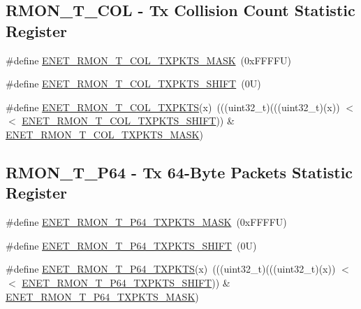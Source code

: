 \subsection*{R\+M\+O\+N\+\_\+\+T\+\_\+\+C\+OL -\/ Tx Collision Count Statistic Register}
\begin{DoxyCompactItemize}
\item 
\#define \mbox{\hyperlink{group___e_n_e_t___register___masks_ga2acdc948ff9f17ae66ed9efd053cf3f4}{E\+N\+E\+T\+\_\+\+R\+M\+O\+N\+\_\+\+T\+\_\+\+C\+O\+L\+\_\+\+T\+X\+P\+K\+T\+S\+\_\+\+M\+A\+SK}}~(0x\+F\+F\+F\+F\+U)
\item 
\#define \mbox{\hyperlink{group___e_n_e_t___register___masks_ga04f557da802770a52c52f3e7eda944de}{E\+N\+E\+T\+\_\+\+R\+M\+O\+N\+\_\+\+T\+\_\+\+C\+O\+L\+\_\+\+T\+X\+P\+K\+T\+S\+\_\+\+S\+H\+I\+FT}}~(0\+U)
\item 
\#define \mbox{\hyperlink{group___e_n_e_t___register___masks_ga0e3dd240f2ffd82851fe62e850caa39a}{E\+N\+E\+T\+\_\+\+R\+M\+O\+N\+\_\+\+T\+\_\+\+C\+O\+L\+\_\+\+T\+X\+P\+K\+TS}}(x)~(((uint32\+\_\+t)(((uint32\+\_\+t)(x)) $<$$<$ \mbox{\hyperlink{group___e_n_e_t___register___masks_ga04f557da802770a52c52f3e7eda944de}{E\+N\+E\+T\+\_\+\+R\+M\+O\+N\+\_\+\+T\+\_\+\+C\+O\+L\+\_\+\+T\+X\+P\+K\+T\+S\+\_\+\+S\+H\+I\+FT}})) \& \mbox{\hyperlink{group___e_n_e_t___register___masks_ga2acdc948ff9f17ae66ed9efd053cf3f4}{E\+N\+E\+T\+\_\+\+R\+M\+O\+N\+\_\+\+T\+\_\+\+C\+O\+L\+\_\+\+T\+X\+P\+K\+T\+S\+\_\+\+M\+A\+SK}})
\end{DoxyCompactItemize}
\subsection*{R\+M\+O\+N\+\_\+\+T\+\_\+\+P64 -\/ Tx 64-\/\+Byte Packets Statistic Register}
\begin{DoxyCompactItemize}
\item 
\#define \mbox{\hyperlink{group___e_n_e_t___register___masks_ga1db32099fbc7f82b96894eceb27fadc7}{E\+N\+E\+T\+\_\+\+R\+M\+O\+N\+\_\+\+T\+\_\+\+P64\+\_\+\+T\+X\+P\+K\+T\+S\+\_\+\+M\+A\+SK}}~(0x\+F\+F\+F\+F\+U)
\item 
\#define \mbox{\hyperlink{group___e_n_e_t___register___masks_gac06c1d984f1ef4f7fe433830c0c45398}{E\+N\+E\+T\+\_\+\+R\+M\+O\+N\+\_\+\+T\+\_\+\+P64\+\_\+\+T\+X\+P\+K\+T\+S\+\_\+\+S\+H\+I\+FT}}~(0\+U)
\item 
\#define \mbox{\hyperlink{group___e_n_e_t___register___masks_gabad226cdad5fe7803f060d4379980bd2}{E\+N\+E\+T\+\_\+\+R\+M\+O\+N\+\_\+\+T\+\_\+\+P64\+\_\+\+T\+X\+P\+K\+TS}}(x)~(((uint32\+\_\+t)(((uint32\+\_\+t)(x)) $<$$<$ \mbox{\hyperlink{group___e_n_e_t___register___masks_gac06c1d984f1ef4f7fe433830c0c45398}{E\+N\+E\+T\+\_\+\+R\+M\+O\+N\+\_\+\+T\+\_\+\+P64\+\_\+\+T\+X\+P\+K\+T\+S\+\_\+\+S\+H\+I\+FT}})) \& \mbox{\hyperlink{group___e_n_e_t___register___masks_ga1db32099fbc7f82b96894eceb27fadc7}{E\+N\+E\+T\+\_\+\+R\+M\+O\+N\+\_\+\+T\+\_\+\+P64\+\_\+\+T\+X\+P\+K\+T\+S\+\_\+\+M\+A\+SK}})
\end{DoxyCompactItemize}
